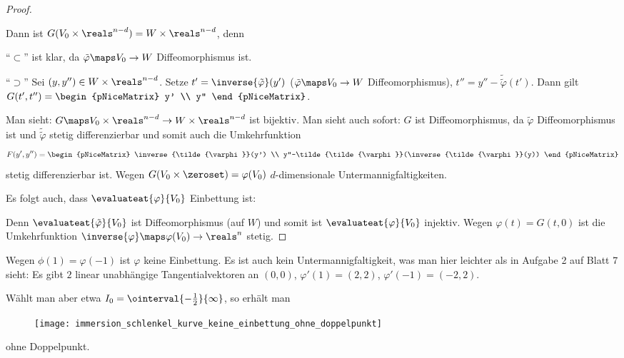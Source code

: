 \begin{proof}
\begin{subproof}
\begin{equation*}
    \end{equation*}
    Dann ist \( G(V_0\times\reals^{n-d})=W\times\reals^{n-d} \), denn
    \begin{proofdescription}
      \item[\enquote{\( \subset \)}] ist klar, da \( \tilde{\varphi}\maps V_0\to W \) Diffeomorphismus ist.
      \item[\enquote{\( \supset  \)}] Sei \( (y,y'')\in W\times\reals^{n-d} \). Setze \( t'=\inverse{\tilde{\varphi}}(y') \) (\( \tilde{\varphi}\maps V_0\to W \) Diffeomorphismus), \( t''=y''-\tilde{\tilde{\varphi}}(t') \). Dann gilt \( G(t',t'')=\begin{pNiceMatrix} y' \\ y'' \end{pNiceMatrix} \).
    \end{proofdescription}
    Man sieht:  \( G\maps V_0\times\reals^{n-d}\to W\times\reals^{n-d} \) ist bijektiv. Man sieht auch sofort: \( G \) ist Diffeomorphismus, da \( \tilde{\varphi} \) Diffeomorphismus ist und \( \tilde{\tilde{\varphi}} \) stetig differenzierbar und somit auch die Umkehrfunktion
    \begin{equation*}
      F(y',y'')=\begin{pNiceMatrix} \inverse{\tilde{\varphi}}(y') \\ y''-\tilde{\tilde{\varphi}}(\inverse{\tilde{\varphi}}(y)) \end{pNiceMatrix}
    \end{equation*}
    stetig differenzierbar ist. Wegen \( G(V_0\times \zeroset) =\varphi(V_0)\) \( d \)-dimensionale Untermannigfaltigkeiten.
  \end{subproof}
  Es folgt auch, dass \( \evaluateat{\varphi}{V_0} \) Einbettung ist:
  
  Denn \(\evaluateat{\tilde{\varphi}}{V_0}  \)
   ist Diffeomorphismus (auf \( W \)) und somit ist
    \( \evaluateat{\varphi}{V_0} \) 
    injektiv. Wegen 
    \( \varphi(t)=G(t,0) \) 
    ist die Umkehrfunktion
     \( \inverse{\varphi}\maps \varphi(V_0)\to \reals^n \) 
     stetig.
\end{proof}
\begin{beispiel*}
  Wegen \( \phi(1)=\varphi(-1) \) ist \( \varphi \) keine Einbettung. Es ist auch kein Untermannigfaltigkeit, was man hier leichter als in Aufgabe 2 auf Blatt 7 sieht: Es gibt \( 2 \) linear unabhängige Tangentialvektoren an \( (0,0) \), \zb \( \varphi'(1)=(2,2) \), \( \varphi'(-1)=(-2,2) \). 
  
  Wählt man aber etwa \( I_0=\ointerval{-\frac{1}{2}}{\infty} \), so erhält man
  \begin{figure}[H]
    \centering
    \texttt{[image: immersion\_schlenkel\_kurve\_keine\_einbettung\_ohne\_doppelpunkt]}
    \label{fig:immersion_schlenkel_kurve_keine_einbettung_ohne_doppelpunkt}
  \end{figure}
  ohne Doppelpunkt.
\end{beispiel*}
